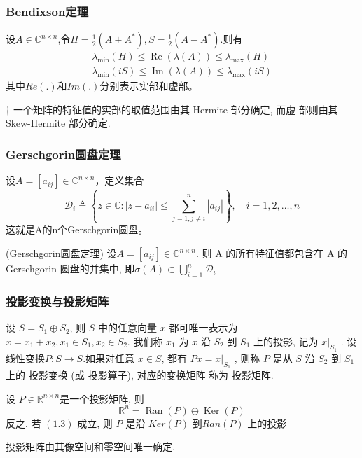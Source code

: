 \documentclass[12pt,a4paper]{article}
\begin{document}
\subsubsection{Bendixson定理}

设$A \in \mathbb{C}^{n \times n}$,令$H=\frac{1}{2}\left(A+A^{*}\right), S=\frac{1}{2}\left(A-A^{*}\right)$.则有
$$
\begin{array}{l}{\lambda_{\min }(H) \leq \operatorname{Re}(\lambda(A)) \leq \lambda_{\max }(H)} \\ {\lambda_{\min }(i S) \leq \operatorname{Im}(\lambda(A)) \leq \lambda_{\max }(i S)}\end{array}
$$
其中$Re(.)$和$Im(.)$分别表示实部和虚部。

\begin{framed}
	† 一个矩阵的特征值的实部的取值范围由其 Hermite 部分确定, 而虚
	部则由其 Skew-Hermite 部分确定.
\end{framed}

\subsubsection{Gerschgorin圆盘定理}
设$A=\left[a_{i j}\right] \in \mathbb{C}^{n \times n}$，定义集合
$$
\mathcal{D}_{i} \triangleq\left\{z \in \mathbb{C} :\left|z-a_{i i}\right| \leq \sum_{j=1, j \neq i}^{n}\left|a_{i j}\right|\right\}, \quad i=1,2, \ldots, n
$$
这就是A的n个Gerschgorin圆盘。

\begin{framed}
	\begin{theorem}(Gerschgorin圆盘定理)
	设$A=\left[a_{i j}\right] \in \mathbb{C}^{n \times n}$. 则 A 的所有特征值都包含在 A 的 Gerschgorin 圆盘的并集中, 即$\sigma(A) \subset \bigcup_{i=1}^{n} \mathcal{D}_{i}$
	\end{theorem}
\end{framed}


\subsubsection{投影变换与投影矩阵}
设 $S = S_1 ⊕ S_2$, 则 $S$ 中的任意向量 $x$ 都可唯一表示为
$x = x_1 + x_2, x_1 ∈ S_1, x_2 ∈ S_2.$
我们称 $x_1$ 为 $x$ 沿 $S_2$ 到 $S_1$ 上的投影, 记为 $x|_{S_1}$
.
设线性变换$ P : S → S. $如果对任意 $x ∈ S$, 都有
$P x = x|_{S_1}$
,
则称 $P$ 是从 $S$ 沿 $S_2$ 到 $S_1$ 上的 投影变换 (或 投影算子), 对应的变换矩阵
称为 投影矩阵.

\begin{framed}
	\begin{lemma}
		设 $P ∈ \mathbb{R}^{n×n} $是一个投影矩阵, 则
		\begin{equation}
		\mathbb{R}^{n}=\operatorname{Ran}(P) \oplus \operatorname{Ker}(P)
		\end{equation}
		反之, 若 $(1.3)$ 成立, 则 $P$ 是沿 $Ker(P)$ 到$ Ran(P)$ 上的投影
	\end{lemma}
\end{framed}
投影矩阵由其像空间和零空间唯一确定.
\end{document}
